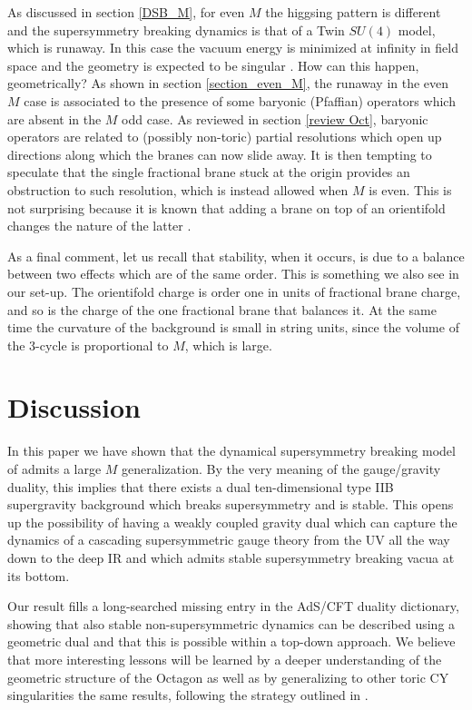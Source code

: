 \documentclass[a4paper,12pt]{article}
\begin{document}
{As discussed in section \ref{DSB_M}, for even $M$ the higgsing pattern is different and the supersymmetry breaking dynamics is that of a Twin $SU(4)$ model, which is runaway. In this case the vacuum energy is minimized at infinity in field space 
and the geometry is expected to be singular \cite{Franco:2005zu}. How can this happen, geometrically? As shown in section \ref{section_even_M}, the runaway in the even $M$ case is associated to the presence of some baryonic (Pfaffian) operators which are absent in the $M$ odd case. As reviewed in section \ref{review Oct}, baryonic operators are related to (possibly non-toric) partial resolutions which open up directions along which the branes can now slide away. 
It is then tempting to speculate that the single fractional brane stuck at the origin provides an obstruction to such resolution, which is instead allowed when $M$ is even. This is not surprising because it is known that adding a brane on top of an orientifold changes the nature of the latter \cite{Witten:1998xy,Hanany:2000fq}.

As a final comment, let us recall that stability, when it occurs, is due to a balance between two effects which are of the same order. This is something we also see in our set-up. The orientifold charge is order one in units of fractional brane charge, and so is the charge of the one fractional brane that balances it. At the same time the curvature of the background is small in string units, since the volume of the 3-cycle is proportional to $M$, which is large. 

\newpage
\section{Discussion}
\label{disc}

In this paper we have shown that the dynamical supersymmetry breaking model of \cite{Argurio:2020dkg,Argurio:2020npm} admits a large $M$ generalization. By the very meaning of the gauge/gravity duality, this implies that there exists a dual ten-dimensional type IIB supergravity background which breaks supersymmetry and is stable. This opens up the possibility of having a weakly coupled gravity dual which can capture the dynamics of a cascading supersymmetric gauge theory from the UV all the way down to the deep IR and which admits stable supersymmetry breaking vacua at its bottom. 

Our result fills a long-searched missing entry in the AdS/CFT duality dictionary, showing that also stable non-supersymmetric dynamics can be described using a geometric dual and that this is possible within a top-down approach. We believe that more interesting lessons will be learned by a deeper understanding of the geometric structure of the Octagon as well as by generalizing to other toric CY singularities the same results, following the strategy outlined in \cite{Argurio:2020npm}. 

}
\end{document}
